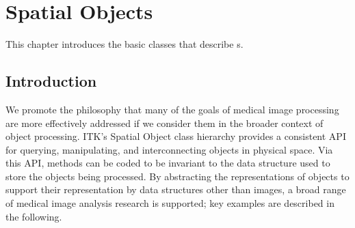 
\chapter{Spatial Objects}
\label{sec:SpatialObjects}

This chapter introduces the basic classes that describe
s.

\section{Introduction}
\label{Introduction}

We promote the philosophy that many of the goals of medical image processing
are more effectively addressed if we consider them in the broader context
of object processing. ITK's Spatial Object class hierarchy provides a
consistent API for querying, manipulating, and interconnecting objects in
physical space.   Via this API, methods can be coded to be invariant to
the data structure used to store the objects being processed.   By
abstracting the representations of objects to support their representation
by data structures other than images, a broad range of medical image
analysis research is supported; key examples are described in the following.

